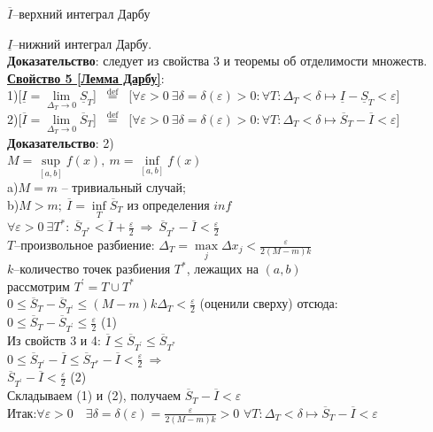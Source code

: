 \documentclass[a4paper,12pt]{article} %
\renewcommand {\leq}{\leqslant}
\begin{document}
	$\overline{I}$--верхний интеграл Дарбу
	
	$\underline{I}$--нижний интеграл Дарбу.\\
	
	\textbf{Доказательство}: следует из свойства 3 и теоремы об отделимости множеств.\\
	
	\underline{\textbf{Свойство 5 [Лемма Дарбу]}}:\\
	1)[$\underline{I}=\lim\limits_{\Delta_T\rightarrow 0}{\underline{S}_T}$] $\stackrel{\text { def }}{=}$ [$\forall\varepsilon>0~\exists\delta = \delta(\varepsilon)>0: \forall T:\Delta_{T}<\delta \longmapsto \underline{I}-\underline{S}_T<\varepsilon$]\\
	2)[$\overline{I}=\lim\limits_{\Delta_T\rightarrow 0}{\overline{S}_T}$] $\stackrel{\text { def }}{=}$ [$\forall\varepsilon>0~\exists\delta = \delta(\varepsilon)>0: \forall T:\Delta_{T}<\delta \longmapsto \overline{S}_T-\overline{I}<\varepsilon$]\\
	
	\textbf{Доказательство}: 2)\\
	$M=\sup\limits_{[a,b]}{f(x)},~m=\inf\limits_{[a,b]}{f(x)}$\\
	a)$M=m$ -- тривиальный случай;\\
	b)$M>m;~\overline{I}=\inf\limits_{T}{\overline{S}_T}$ из определения $inf$\\
	$\forall \varepsilon>0~\exists T^{*}:~\overline{S}_{T^{*}}<\overline{I}+\frac{\varepsilon}{2}~\Rightarrow~\overline{S}_{T^{*}}-\overline{I}<\frac{\varepsilon}{2}$\\
	$T$--произвольное разбиение: $\Delta_T=\max\limits_{j}{\Delta x_j}<\frac{\varepsilon}{2(M-m)k}$\\
	$k$--количество точек разбиения $T^{*}$, лежащих на $(a,b)$\\
	рассмотрим $T^{\prime}=T\cup T^{*}$\\
	$0\leq \overline{S}_T-\overline{S}_{T^{\prime}}\leq (M-m)k\Delta_T<\frac{\varepsilon}{2}$ (оценили сверху) отсюда:\\
	$0\leq \overline{S}_T-\overline{S}_{T^{\prime}}\leq \frac{\varepsilon}{2}$ (1)\\
	Из свойств 3 и 4: $\overline{I}\leq \overline{S}_{T^{\prime}}\leq  \overline{S}_{T^{*}}$\\
	$0\leq  \overline{S}_{T^{\prime}}-\overline{I}\leq \overline{S}_{T^{*}}-\overline{I}<\frac{\varepsilon}{2}~\Rightarrow$\\
	$\overline{S}_{T^{\prime}}-\overline{I}<\frac{\varepsilon}{2}$ (2)\\
	Складываем (1) и (2), получаем $ \overline{S}_T-\overline{I}<\varepsilon$\\
	Итак:$\forall \varepsilon>0 \quad \exists \delta=\delta(\varepsilon)=\frac{\varepsilon}{2(M-m) k}>0$
	$\forall T: \Delta_{T}<\delta \longmapsto\overline{S}_T-\overline{I}<\varepsilon$\\
	
\end{document}
